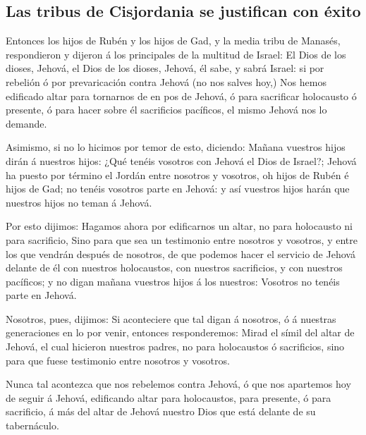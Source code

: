 \hypertarget{las-tribus-de-cisjordania-se-justifican-con-uxe9xito}{%
\subsection{Las tribus de Cisjordania se justifican con
éxito}\label{las-tribus-de-cisjordania-se-justifican-con-uxe9xito}}

 Entonces los hijos de Rubén y los hijos de Gad, y la
media tribu de Manasés, respondieron y dijeron á los principales de la
multitud de Israel:  El Dios de los dioses, Jehová, el
Dios de los dioses, Jehová, él sabe, y sabrá Israel: si por rebelión ó
por prevaricación contra Jehová (no nos salves hoy,)  Nos
hemos edificado altar para tornarnos de en pos de Jehová, ó para
sacrificar holocausto ó presente, ó para hacer sobre él sacrificios
pacíficos, el mismo Jehová nos lo demande.

 Asimismo, si no lo hicimos por temor de esto, diciendo:
Mañana vuestros hijos dirán á nuestros hijos: ¿Qué tenéis vosotros con
Jehová el Dios de Israel?;  Jehová ha puesto por término
el Jordán entre nosotros y vosotros, oh hijos de Rubén é hijos de Gad;
no tenéis vosotros parte en Jehová: y así vuestros hijos harán que
nuestros hijos no teman á Jehová.

 Por esto dijimos: Hagamos ahora por edificarnos un
altar, no para holocausto ni para sacrificio,  Sino para
que sea un testimonio entre nosotros y vosotros, y entre los que vendrán
después de nosotros, de que podemos hacer el servicio de Jehová delante
de él con nuestros holocaustos, con nuestros sacrificios, y con nuestros
pacíficos; y no digan mañana vuestros hijos á los nuestros: Vosotros no
tenéis parte en Jehová.

 Nosotros, pues, dijimos: Si aconteciere que tal digan á
nosotros, ó á nuestras generaciones en lo por venir, entonces
responderemos: Mirad el símil del altar de Jehová, el cual hicieron
nuestros padres, no para holocaustos ó sacrificios, sino para que fuese
testimonio entre nosotros y vosotros.

 Nunca tal acontezca que nos rebelemos contra Jehová, ó
que nos apartemos hoy de seguir á Jehová, edificando altar para
holocaustos, para presente, ó para sacrificio, á más del altar de Jehová
nuestro Dios que está delante de su tabernáculo.

